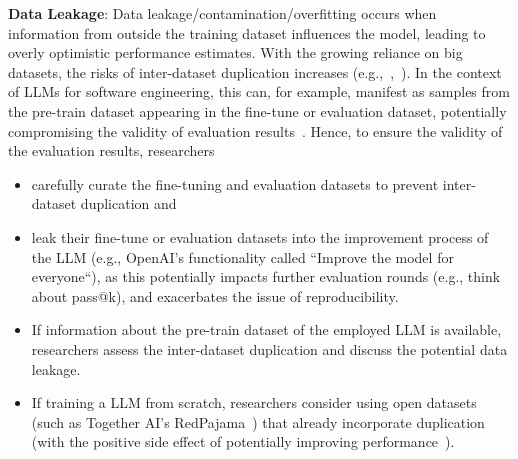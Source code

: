 \textbf{Data Leakage}:
Data leakage/contamination/overfitting occurs when information from outside the training dataset influences the model, leading to overly optimistic performance estimates. With the growing reliance on big datasets, the risks of inter-dataset duplication increases (e.g.,~\cite{DBLP:journals/pacmpl/LopesMMSYZSV17},~\cite{DBLP:conf/oopsla/Allamanis19}). 
In the context of LLMs for software engineering, this can, for example, manifest as samples from the pre-train dataset appearing in the fine-tune or evaluation dataset, potentially compromising the validity of evaluation results~\cite{DBLP:journals/tse/LopezCSSV25}.
Hence, to ensure the validity of the evaluation results, researchers
\begin{itemize}
  \item \should carefully curate the fine-tuning and evaluation datasets to prevent inter-dataset duplication and
  \item \mustnot leak their fine-tune or evaluation datasets into the improvement process of the LLM (e.g., OpenAI's functionality called ``Improve the model for everyone``), as this potentially impacts further evaluation rounds (e.g., think about pass@k), and exacerbates the issue of reproducibility.
  \item If information about the pre-train dataset of the employed LLM is available, researchers \should assess the inter-dataset duplication and \must discuss the potential data leakage.
  \item If training a LLM from scratch, researchers \may consider using open datasets (such as Together AI's RedPajama~\cite{together2023redpajama}) that already incorporate duplication (with the positive side effect of potentially improving performance~\cite{DBLP:conf/acl/LeeINZECC22}).
\end{itemize}

